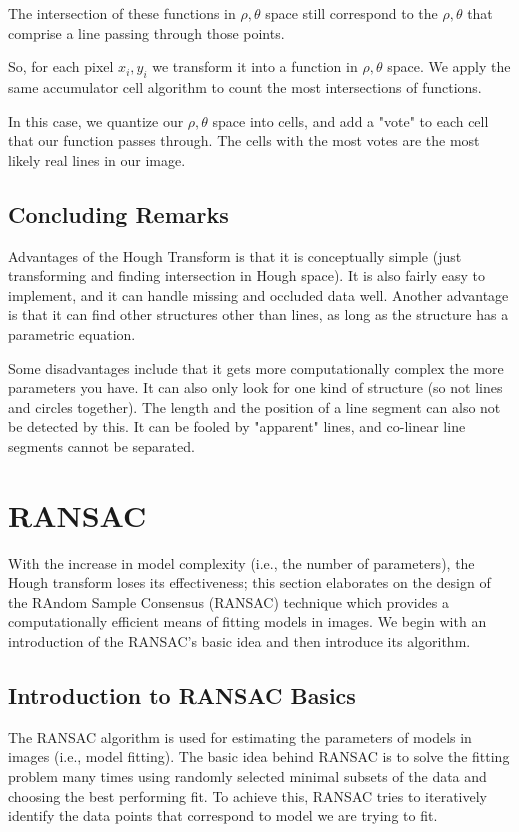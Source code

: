 \documentclass{article}
\begin{document}
The intersection of these functions in $\rho, \theta$ space still correspond to the $\rho, \theta$ that comprise a line passing through those points.

So, for each pixel $x_i, y_i$ we transform it into a function in  $\rho, \theta$ space. We apply the same accumulator cell algorithm to count the most intersections of functions.

In this case, we quantize our $\rho, \theta$ space into cells, and add a "vote" to each cell that our function passes through. The cells with the most votes are the most likely real lines in our image.

\subsection{Concluding Remarks}
Advantages of the Hough Transform is that it is conceptually simple (just transforming and finding intersection in Hough space). It is also fairly easy to implement, and it can handle missing and occluded data well. Another advantage is that it can find other structures other than lines, as long as the structure has a parametric equation.

Some disadvantages include that it gets more computationally complex the more parameters you have. It can also only look for one kind of structure (so not lines and circles together). The length and the position of a line segment can also not be detected by this. It can be fooled by "apparent" lines, and co-linear line segments cannot be separated.
\section{RANSAC}
With the increase in model complexity (i.e., the number of parameters), the Hough transform loses its effectiveness; this section elaborates on the design of the RAndom Sample Consensus (RANSAC) technique \cite{fischler1981random} which provides a computationally efficient means of fitting models in images. We begin with an introduction of the RANSAC's basic idea and then introduce its algorithm.
\subsection{Introduction to RANSAC Basics}
The RANSAC algorithm is used for estimating the parameters of models in images (i.e., model fitting). The basic idea behind RANSAC is to solve the fitting problem many times using randomly selected minimal subsets of the data and choosing the best performing fit. To achieve this, RANSAC tries to iteratively identify the data points that correspond to model we are trying to fit.
\end{document}
